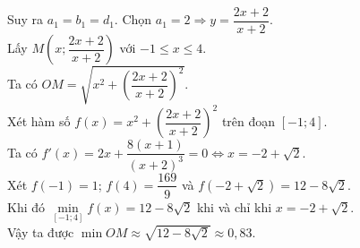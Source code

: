 \begin{ex}
{		Suy ra $a_1=b_1=d_1$. Chọn $a_1=2 \Rightarrow y=\dfrac{2x+2}{x+2}$.\\
		Lấy $M\left(x;\dfrac{2x+2}{x+2}\right)$ với $-1\le x\le4$.\\
		Ta có $OM=\sqrt{x^2+\left(\dfrac{2x+2}{x+2}\right)^2}$.\\
		Xét hàm số $f(x)=x^2+\left(\dfrac{2x+2}{x+2}\right)^2$ trên đoạn $[-1;4]$.\\
		Ta có $f'(x)=2x+\dfrac{8(x+1)}{(x+2)^3}=0\Leftrightarrow x=-2+\sqrt{2}$.\\
		Xét $f(-1)=1$; $f(4)=\dfrac{169}{9}$ và $f\left(-2+\sqrt{2}\right)=12-8\sqrt{2}$.\\
		Khi đó $\min\limits_{[-1;4]} f(x)=12-8\sqrt{2}$ khi và chỉ khi $x=-2+\sqrt{2}$.\\
		Vậy ta được $\min OM\approx \sqrt{12-8\sqrt{2}}\approx 0{,}83$.
	}
\end{ex}



{}

